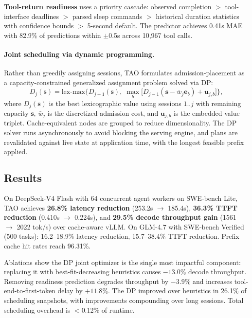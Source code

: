 \documentclass[11pt,a4paper]{article}
\begin{document}
\textbf{Tool-return readiness} uses a priority cascade: observed completion $>$ tool-interface deadlines $>$ parsed sleep commands $>$ historical duration statistics with confidence bounds $>$ 5-second default. The predictor achieves 0.41s MAE with 82.9\% of predictions within $\pm$0.5s across 10,967 tool calls.

\paragraph{Joint scheduling via dynamic programming.} Rather than greedily assigning sessions, TAO formulates admission-placement as a capacity-constrained generalized assignment problem solved via DP:
\begin{equation}
  D_j(\mathbf{s}) = \mathrm{lex\text{-}max}\bigl\{D_{j{-}1}(\mathbf{s}),\; \max_b\bigl[D_{j{-}1}(\mathbf{s} - \bar{w}_j \mathbf{e}_b) + \mathbf{u}_{j,b}\bigr]\bigr\},
\end{equation}
where $D_j(\mathbf{s})$ is the best lexicographic value using sessions $1..j$ with remaining capacity $\mathbf{s}$, $\bar{w}_j$ is the discretized admission cost, and $\mathbf{u}_{j,b}$ is the embedded value triplet. Cache-equivalent nodes are grouped to reduce dimensionality. The DP solver runs asynchronously to avoid blocking the serving engine, and plans are revalidated against live state at application time, with the longest feasible prefix applied.

\subsection{Results}
On DeepSeek-V4 Flash with 64 concurrent agent workers on SWE-bench Lite, TAO achieves \textbf{26.8\% latency reduction} (253.2s $\to$ 185.4s), \textbf{36.3\% TTFT reduction} (0.410s $\to$ 0.224s), and \textbf{29.5\% decode throughput gain} (1561 $\to$ 2022 tok/s) over cache-aware vLLM. On GLM-4.7 with SWE-bench Verified (500 tasks): 16.2--18.9\% latency reduction, 15.7--38.4\% TTFT reduction. Prefix cache hit rates reach 96.31\%.

Ablations show the DP joint optimizer is the single most impactful component: replacing it with best-fit-decreasing heuristics causes $-13.0\%$ decode throughput. Removing readiness prediction degrades throughput by $-3.9\%$ and increases tool-end-to-first-token delay by $+11.8\%$. The DP improved over heuristics in 26.1\% of scheduling snapshots, with improvements compounding over long sessions. Total scheduling overhead is $<$0.12\% of runtime.
\end{document}
